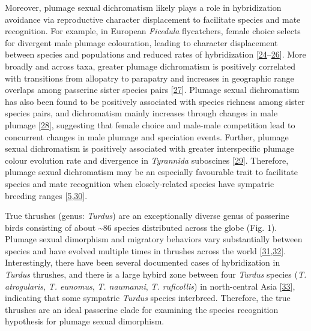 \documentclass[
  a4paper,
]{article}
\begin{document}
Moreover, plumage sexual dichromatism likely plays a role in
hybridization avoidance via reproductive character displacement to
facilitate species and mate recognition. For example, in European
\emph{Ficedula} flycatchers, female choice selects for divergent male
plumage colouration, leading to character displacement between species
and populations and reduced rates of hybridization
{[}\protect\hyperlink{ref-alatalo1994}{24}--\protect\hyperlink{ref-laaksonen2015}{26}{]}.
More broadly and across taxa, greater plumage dichromatism is positively
correlated with transitions from allopatry to parapatry and increases in
geographic range overlaps among passerine sister species pairs
{[}\protect\hyperlink{ref-cooney2017}{27}{]}. Plumage sexual
dichromatism has also been found to be positively associated with
species richness among sister species pairs, and dichromatism mainly
increases through changes in male plumage
{[}\protect\hyperlink{ref-seddon2013}{28}{]}, suggesting that female
choice and male-male competition lead to concurrent changes in male
plumage and speciation events. Further, plumage sexual dichromatism is
positively associated with greater interspecific plumage colour
evolution rate and divergence in \emph{Tyrannida} suboscines
{[}\protect\hyperlink{ref-cooney2019}{29}{]}. Therefore, plumage sexual
dichromatism may be an especially favourable trait to facilitate species
and mate recognition when closely-related species have sympatric
breeding ranges
{[}\protect\hyperlink{ref-martin2015a}{5},\protect\hyperlink{ref-martin2010}{30}{]}.

True thrushes (genus: \emph{Turdus}) are an exceptionally diverse genus
of passerine birds consisting of about \textasciitilde86 species
distributed across the globe (Fig. 1). Plumage sexual dimorphism and
migratory behaviors vary substantially between species and have evolved
multiple times in thrushes across the world
{[}\protect\hyperlink{ref-clement2000}{31},\protect\hyperlink{ref-nagy2019}{32}{]}.
Interestingly, there have been several documented cases of hybridization
in \emph{Turdus} thrushes, and there is a large hybird zone between four
\emph{Turdus} species (\emph{T. atrogularis}, \emph{T. eunomus},
\emph{T. naumanni}, \emph{T. ruficollis}) in north-central Asia
{[}\protect\hyperlink{ref-mccarthy2006}{33}{]}, indicating that some
sympatric \emph{Turdus} species interbreed. Therefore, the true thrushes
are an ideal passerine clade for examining the species recognition
hypothesis for plumage sexual dimorphism.
\end{document}
